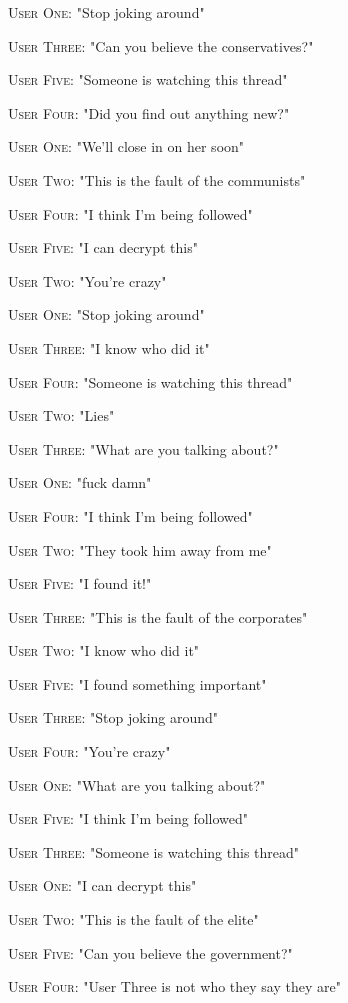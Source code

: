 \documentclass{report}
\begin{document}
\textsc{User One}: "Stop joking around" 

\textsc{User Three}: "Can you believe the conservatives?" 

\textsc{User Five}: "Someone is watching this thread" 

\textsc{User Four}: "Did you find out anything new?" 

\textsc{User One}: "We'll close in on her soon" 

\textsc{User Two}: "This is the fault of the communists" 

\textsc{User Four}: "I think I'm being followed" 

\textsc{User Five}: "I can decrypt this" 

\textsc{User Two}: "You're crazy" 

\textsc{User One}: "Stop joking around" 

\textsc{User Three}: "I know who did it" 

\textsc{User Four}: "Someone is watching this thread" 

\textsc{User Two}: "Lies" 

\textsc{User Three}: "What are you talking about?" 

\textsc{User One}: "fuck damn" 

\textsc{User Four}: "I think I'm being followed" 

\textsc{User Two}: "They took him away from me" 

\textsc{User Five}: "I found it!" 

\textsc{User Three}: "This is the fault of the corporates" 

\textsc{User Two}: "I know who did it" 

\textsc{User Five}: "I found something important" 

\textsc{User Three}: "Stop joking around" 

\textsc{User Four}: "You're crazy" 

\textsc{User One}: "What are you talking about?" 

\textsc{User Five}: "I think I'm being followed" 

\textsc{User Three}: "Someone is watching this thread" 

\textsc{User One}: "I can decrypt this" 

\textsc{User Two}: "This is the fault of the elite" 

\textsc{User Five}: "Can you believe the government?" 

\textsc{User Four}: "User Three is not who they say they are" 
\end{document}

